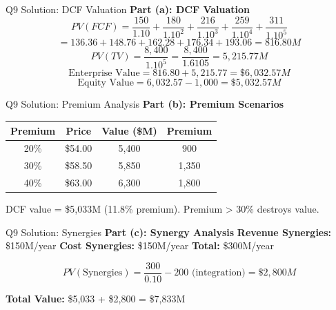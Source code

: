 \documentclass[aspectratio=169,10pt]{beamer}
\renewcommand{\small}{\fontsize{6pt}{7.5pt}\selectfont}
\renewcommand{\large}{\fontsize{8pt}{10pt}\selectfont}
\newcommand{\question}[1]{{\large\bfseries\color{crimson}#1}}
\begin{document}
	\begin{frame}{Q9 Solution: DCF Valuation}
		\question{Part (a): DCF Valuation}
		\small
		\[
		PV(FCF) = \frac{150}{1.10} + \frac{180}{1.10^2} + \frac{216}{1.10^3} + \frac{259}{1.10^4} + \frac{311}{1.10^5}
		\]
		\[
		= 136.36 + 148.76 + 162.28 + 176.34 + 193.06 = \boxed{816.80M}
		\]
		\[
		PV(TV) = \frac{8,400}{1.10^5} = \frac{8,400}{1.6105} = \boxed{5,215.77M}
		\]
		\[
		\text{Enterprise Value} = 816.80 + 5,215.77 = \boxed{\$6,032.57M}
		\]
		\[
		\text{Equity Value} = 6,032.57 - 1,000 = \boxed{\$5,032.57M}
		\]
	\end{frame}
	
	\begin{frame}{Q9 Solution: Premium Analysis}
		\question{Part (b): Premium Scenarios}
		\small
		\begin{table}[h]
			\centering
			\begin{tabular}{|c|c|c|c|}
				\hline
				\textbf{Premium} & \textbf{Price} & \textbf{Value (\$M)} & \textbf{Premium} \\
				\hline
				20\% & \$54.00 & 5,400 & 900 \\
				30\% & \$58.50 & 5,850 & 1,350 \\
				40\% & \$63.00 & 6,300 & 1,800 \\
				\hline
			\end{tabular}
		\end{table}
		
		\vspace{0.1cm}
		DCF value = \$5,033M (11.8\% premium).
		Premium > 30\% destroys value.
	\end{frame}
	
	\begin{frame}{Q9 Solution: Synergies}
		\question{Part (c): Synergy Analysis}
		\small
		\textbf{Revenue Synergies:} \$150M/year
		\textbf{Cost Synergies:} \$150M/year
		\textbf{Total:} \$300M/year
		
		\vspace{0.1cm}
		\[
		PV(\text{Synergies}) = \frac{300}{0.10} - 200 \text{ (integration)} = \boxed{\$2,800M}
		\]
		
		\vspace{0.1cm}
		\textbf{Total Value:} \$5,033 + \$2,800 = \$7,833M
	\end{frame}
	
\end{document}
